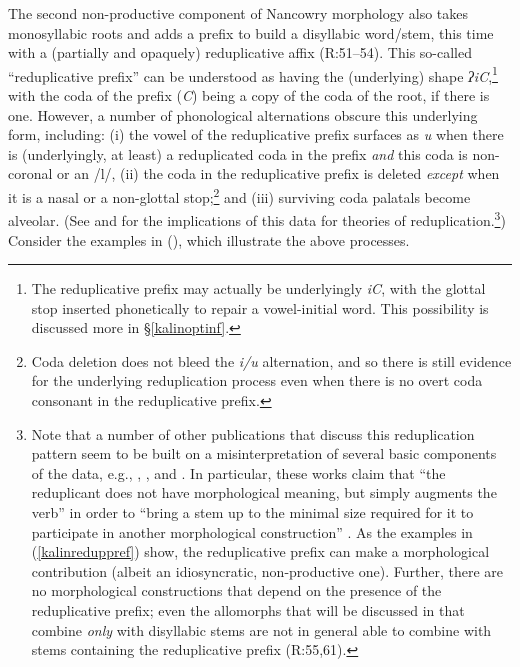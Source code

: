 \documentclass[output=paper]{langscibook}
\newcounter{nexttmp}    %
\newcommand{\Next}{\setcounter{nexttmp}{\value{equation}}\stepcounter{nexttmp}(\thenexttmp)\xspace}
\begin{document}
The second non-productive component of Nancowry morphology also takes monosyllabic roots and adds a prefix to build a disyllabic word/stem, this time with a (partially and opaquely) reduplicative affix (R:51--54). This so-called ``reduplicative prefix'' can be understood as having the (underlying) shape \textit{ʔiC},\footnote{The reduplicative prefix may actually be underlyingly \textit{iC}, with the glottal stop inserted phonetically to repair a vowel-initial word. This possibility is discussed more in \S\ref{kalinoptinf}.} with the coda of the prefix (\textit{C}) being a copy of the coda of the root, if there is one. However, a number of phonological alternations obscure this underlying form, including: (i)  the vowel of the reduplicative prefix surfaces as \textit{u} when there is (underlyingly, at least) a reduplicated coda in the prefix {\it and} this coda is non-coronal or an /l/, (ii) the coda in the reduplicative prefix is deleted {\it except} when it is a nasal or a non-glottal stop;\footnote{Coda deletion does {not} bleed the \textit{i/u} alternation, and so there is still evidence for the underlying reduplication process even when there is no overt coda consonant in the reduplicative prefix.} and (iii) surviving coda palatals become alveolar. (See \citealt[132ff.]{Steriade88} and \citealt[347ff.]{Alderete99} for the implications of this data for theories of reduplication.\footnote{Note that a number of other publications that discuss this reduplication pattern seem to be built on a misinterpretation of several basic components of the data, e.g., \citealt[247ff]{Hendricks99}, \citealt{Meek00}, and \citealt[223--224]{IZ05}. In particular, these works claim that ``the reduplicant does not have morphological meaning, but simply augments the verb'' \citep[58]{Hendricks99} in order to ``bring a stem up to the minimal size required for it to participate in another morphological construction'' \citep[200--201]{IZ05}. As the examples in (\ref{kalinreduppref}) show, the reduplicative prefix can make a morphological contribution (albeit an idiosyncratic, non-productive one). Further, there are no morphological constructions that depend on the presence of the reduplicative prefix; even the allomorphs that will be discussed in  that combine {\it only} with disyllabic stems are not in general able to combine with stems containing the reduplicative prefix (R:55,61).}) Consider the examples in \Next, which illustrate the above processes.

\ea\label{kalinreduppref} 
\z
\z
\end{document}
